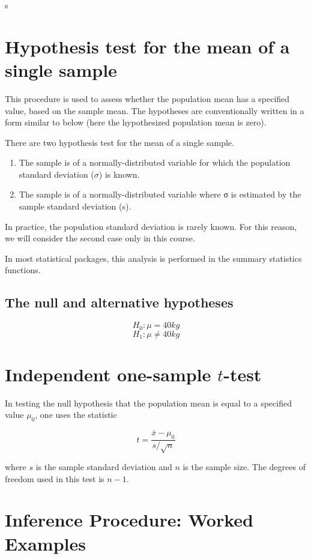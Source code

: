 s\documentclass[]{report}
\begin{document}
\section{Hypothesis test for the mean of a single sample}

This procedure is used to assess whether the population mean  has a specified value, based on the sample mean. The hypotheses are conventionally written in a form similar to below (here the hypothesized population mean is zero).



There are two hypothesis test for the mean of a single sample.

\begin{enumerate}
\item The sample is of a normally-distributed variable for which the population standard deviation ($\sigma$) is known. 
\item The sample is of a normally-distributed variable where σ is estimated by the sample standard deviation (s).
\end{enumerate} 
In practice, the population standard deviation is rarely known. For this reason, we will consider the second case only in this course.

In most statistical packages, this analysis is performed in the summary statistics functions.




\subsection*{The null and alternative hypotheses}
\[ H_0: \mu = 40 kg\]
\[ H_1: \mu \neq 40 kg\]


\section{Independent one-sample $t$-test}
In testing the null hypothesis that the population mean is equal to a specified value $\mu_{0}$, one uses the statistic

\begin{equation}t = \frac{\overline{x} - \mu_0}{s / \sqrt{n}}\end{equation}

where $s$ is the sample standard deviation and $n$ is the sample size. The degrees of freedom used in this test is $n - 1$.




\section{Inference Procedure: Worked Examples}
\end{document}
